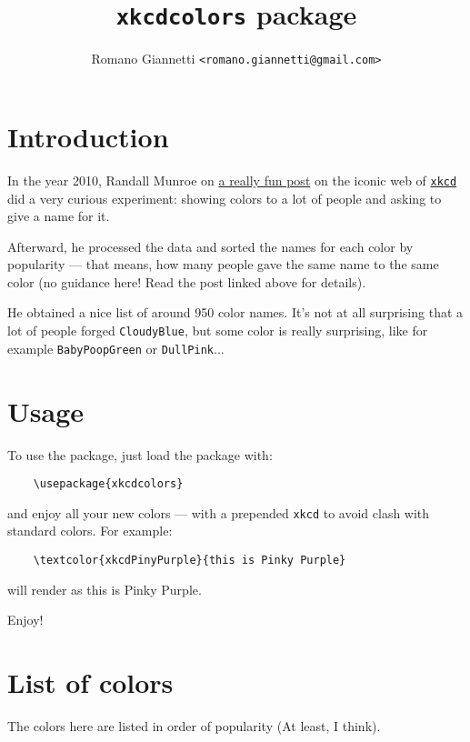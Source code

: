 \documentclass[12pt]{article}
\title{\texttt{xkcdcolors} package}
\author{Romano Giannetti \texttt{<romano.giannetti@gmail.com>}}
\begin{document}
\maketitle
\section{Introduction}

In the year 2010, Randall Munroe on \href{https://blog.xkcd.com/2010/05/03/color-survey-results/}{a really fun post} on the iconic web of \href{https://xkcd.com/}{\texttt{xkcd}} did a very curious experiment: showing colors to a lot of people and asking to give a name for it.

Afterward, he processed the data and sorted the names for each color by popularity --- that means, how many people gave the same name to the same color (no guidance here! Read the post linked above for details).

He obtained a nice list of around 950 color names. It's not at all surprising that a lot of people forged \texttt{CloudyBlue}, but some color is really surprising, like for example \texttt{BabyPoopGreen} or \texttt{DullPink}...

\section{Usage}
To use the package, just load the package with:

\begin{verbatim}
    \usepackage{xkcdcolors}
\end{verbatim}

\noindent and enjoy all your new colors --- with a prepended \texttt{xkcd} to avoid clash with standard colors. For example:

\begin{verbatim}
    \textcolor{xkcdPinyPurple}{this is Pinky Purple}
\end{verbatim}

\noindent will render as \textcolor{xkcdPinkyPurple}{this is Pinky Purple}.

\bigskip

\noindent Enjoy!

\section{List of colors}
The colors here are listed in order of popularity (At least, I think).
\end{document}
